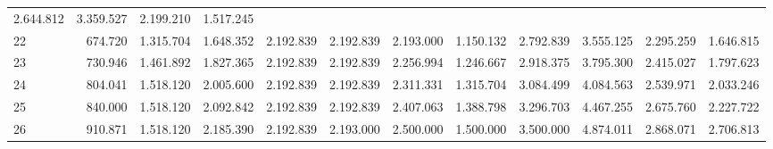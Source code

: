 \begin{tabular}{llllllllllll}
  \multicolumn{1}{r}{2.644.812} &
  \multicolumn{1}{r}{3.359.527} &
  \multicolumn{1}{r}{2.199.210} &
  \multicolumn{1}{r}{1.517.245} \\
\multicolumn{1}{l}{\hspace{1em}22} &
  \multicolumn{1}{|r}{674.720} &
  \multicolumn{1}{r}{1.315.704} &
  \multicolumn{1}{r}{1.648.352} &
  \multicolumn{1}{r}{2.192.839} &
  \multicolumn{1}{r}{2.192.839} &
  \multicolumn{1}{r}{2.193.000} &
  \multicolumn{1}{r}{1.150.132} &
  \multicolumn{1}{r}{2.792.839} &
  \multicolumn{1}{r}{3.555.125} &
  \multicolumn{1}{r}{2.295.259} &
  \multicolumn{1}{r}{1.646.815} \\
\multicolumn{1}{l}{\hspace{1em}23} &
  \multicolumn{1}{|r}{730.946} &
  \multicolumn{1}{r}{1.461.892} &
  \multicolumn{1}{r}{1.827.365} &
  \multicolumn{1}{r}{2.192.839} &
  \multicolumn{1}{r}{2.192.839} &
  \multicolumn{1}{r}{2.256.994} &
  \multicolumn{1}{r}{1.246.667} &
  \multicolumn{1}{r}{2.918.375} &
  \multicolumn{1}{r}{3.795.300} &
  \multicolumn{1}{r}{2.415.027} &
  \multicolumn{1}{r}{1.797.623} \\
\multicolumn{1}{l}{\hspace{1em}24} &
  \multicolumn{1}{|r}{804.041} &
  \multicolumn{1}{r}{1.518.120} &
  \multicolumn{1}{r}{2.005.600} &
  \multicolumn{1}{r}{2.192.839} &
  \multicolumn{1}{r}{2.192.839} &
  \multicolumn{1}{r}{2.311.331} &
  \multicolumn{1}{r}{1.315.704} &
  \multicolumn{1}{r}{3.084.499} &
  \multicolumn{1}{r}{4.084.563} &
  \multicolumn{1}{r}{2.539.971} &
  \multicolumn{1}{r}{2.033.246} \\
\multicolumn{1}{l}{\hspace{1em}25} &
  \multicolumn{1}{|r}{840.000} &
  \multicolumn{1}{r}{1.518.120} &
  \multicolumn{1}{r}{2.092.842} &
  \multicolumn{1}{r}{2.192.839} &
  \multicolumn{1}{r}{2.192.839} &
  \multicolumn{1}{r}{2.407.063} &
  \multicolumn{1}{r}{1.388.798} &
  \multicolumn{1}{r}{3.296.703} &
  \multicolumn{1}{r}{4.467.255} &
  \multicolumn{1}{r}{2.675.760} &
  \multicolumn{1}{r}{2.227.722} \\
\multicolumn{1}{l}{\hspace{1em}26} &
  \multicolumn{1}{|r}{910.871} &
  \multicolumn{1}{r}{1.518.120} &
  \multicolumn{1}{r}{2.185.390} &
  \multicolumn{1}{r}{2.192.839} &
  \multicolumn{1}{r}{2.193.000} &
  \multicolumn{1}{r}{2.500.000} &
  \multicolumn{1}{r}{1.500.000} &
  \multicolumn{1}{r}{3.500.000} &
  \multicolumn{1}{r}{4.874.011} &
  \multicolumn{1}{r}{2.868.071} &
  \multicolumn{1}{r}{2.706.813} \\

\end{tabular}
